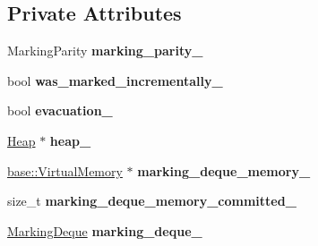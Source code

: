 \subsection*{Private Attributes}
\begin{DoxyCompactItemize}
\item 
Marking\+Parity {\bfseries marking\+\_\+parity\+\_\+}\hypertarget{classv8_1_1internal_1_1_mark_compact_collector_a3adb8e5b09333f303051e9b8e68ae2ca}{}\label{classv8_1_1internal_1_1_mark_compact_collector_a3adb8e5b09333f303051e9b8e68ae2ca}

\item 
bool {\bfseries was\+\_\+marked\+\_\+incrementally\+\_\+}\hypertarget{classv8_1_1internal_1_1_mark_compact_collector_ad9c896510f4cadf226de60268ffc9cdf}{}\label{classv8_1_1internal_1_1_mark_compact_collector_ad9c896510f4cadf226de60268ffc9cdf}

\item 
bool {\bfseries evacuation\+\_\+}\hypertarget{classv8_1_1internal_1_1_mark_compact_collector_a6795713fdc4c09ef1cbe1d309347e705}{}\label{classv8_1_1internal_1_1_mark_compact_collector_a6795713fdc4c09ef1cbe1d309347e705}

\item 
\hyperlink{classv8_1_1internal_1_1_heap}{Heap} $\ast$ {\bfseries heap\+\_\+}\hypertarget{classv8_1_1internal_1_1_mark_compact_collector_ae026d2c71ce15dc329b96747f174362b}{}\label{classv8_1_1internal_1_1_mark_compact_collector_ae026d2c71ce15dc329b96747f174362b}

\item 
\hyperlink{classv8_1_1base_1_1_virtual_memory}{base\+::\+Virtual\+Memory} $\ast$ {\bfseries marking\+\_\+deque\+\_\+memory\+\_\+}\hypertarget{classv8_1_1internal_1_1_mark_compact_collector_a2ede3132d05dd571bb661dcb365e6403}{}\label{classv8_1_1internal_1_1_mark_compact_collector_a2ede3132d05dd571bb661dcb365e6403}

\item 
size\+\_\+t {\bfseries marking\+\_\+deque\+\_\+memory\+\_\+committed\+\_\+}\hypertarget{classv8_1_1internal_1_1_mark_compact_collector_a275623a71a28fc52ad8daafd95b3a052}{}\label{classv8_1_1internal_1_1_mark_compact_collector_a275623a71a28fc52ad8daafd95b3a052}

\item 
\hyperlink{classv8_1_1internal_1_1_marking_deque}{Marking\+Deque} {\bfseries marking\+\_\+deque\+\_\+}\hypertarget{classv8_1_1internal_1_1_mark_compact_collector_a2448477e4c39223a855e72f2f349a109}{}\label{classv8_1_1internal_1_1_mark_compact_collector_a2448477e4c39223a855e72f2f349a109}


\end{DoxyCompactItemize}
